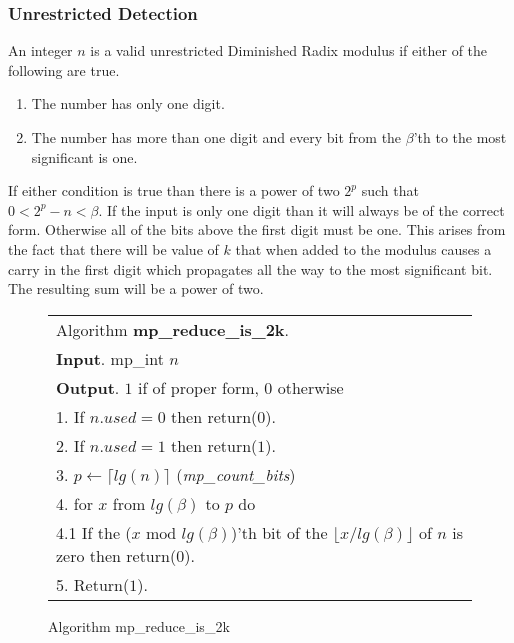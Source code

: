 \documentclass[b5paper]{book}
\begin{document}
\subsubsection{Unrestricted Detection}
An integer $n$ is a valid unrestricted Diminished Radix modulus if either of the following are true.

\begin{enumerate}
\item  The number has only one digit.
\item  The number has more than one digit and every bit from the $\beta$'th to the most significant is one.
\end{enumerate}

If either condition is true than there is a power of two $2^p$ such that $0 < 2^p - n < \beta$.   If the input is only
one digit than it will always be of the correct form.  Otherwise all of the bits above the first digit must be one.  This arises from the fact
that there will be value of $k$ that when added to the modulus causes a carry in the first digit which propagates all the way to the most
significant bit.  The resulting sum will be a power of two.

\begin{figure}[!here]
\begin{small}
\begin{center}
\begin{tabular}{l}
\hline Algorithm \textbf{mp\_reduce\_is\_2k}. \\
\textbf{Input}.   mp\_int $n$   \\
\textbf{Output}.  $1$ if of proper form, $0$ otherwise \\
\hline
1.  If $n.used = 0$ then return($0$). \\
2.  If $n.used = 1$ then return($1$). \\
3.  $p \leftarrow \lceil lg(n) \rceil$  (\textit{mp\_count\_bits}) \\
4.  for $x$ from $lg(\beta)$ to $p$ do \\
\hspace{3mm}4.1  If the ($x \mbox{ mod }lg(\beta)$)'th bit of the $\lfloor x / lg(\beta) \rfloor$ of $n$ is zero then return($0$). \\
5.  Return($1$). \\
\hline
\end{tabular}
\end{center}
\end{small}
\caption{Algorithm mp\_reduce\_is\_2k}
\end{figure}
\end{document}
